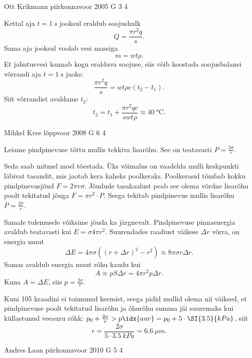 \documentclass[11pt, twoside]{article}
\begin{document}
{%
{Ott Krikmann} %
{piirkonnavoor} %
{2005} %
{G 3} %
{4} %
{

\ifSolution
Kettal aja $t = \SI{1}{s}$ jooksul eraldub soojushulk
\[
Q = \frac{\pi r^2 q}{s}.
\]
Sama aja jooksul voolab vesi massiga
\[
m = wt\rho.
\]
Et jahutusvesi kannab kogu eralduva soojuse, siis võib koostada soojusbalansi võrrandi aja $t = \SI{1}{s}$ jaoks:
\[
\frac{\pi r^{2} q}{s}=w t \rho c\left(t_{2}-t_{1}\right).
\]
Siit võrrandist avaldame $t_2$:
\[
t_2 = t_1 + \frac{\pi r^2qc}{swt\rho} \approx \SI{40}{\celsius}.
\]
\fi
}

{Mihkel Kree} %
{lõppvoor} %
{2008} %
{G 6} %
{4} %
{

\ifSolution
Leiame pindpinevuse tõttu mullis tekkiva lisarõhu. See on teatavasti $P = \frac{2\sigma}{r}$.

Seda saab mitmel moel tõestada. Üks võimalus on vaadelda mulli keskpunkti läbivat tasandit, mis jaotab kera kaheks poolkeraks. Poolkerasid tõmbab kokku pindpinevusjõud $F = 2\pi r\sigma$. Jõudude tasakaalust peab see olema võrdne lisarõhu poolt tekitatud jõuga $F = \pi r^2 \cdot P$. Seega tekitab pindpinevus mullis lisarõhu $P = \frac{2\sigma}{r}$.

Samale tulemusele võiksime jõuda ka järgnevalt. Pindpinevuse pinnaenergia avaldub teatavasti kui $E = \sigma 4\pi r^2$. Suurendades raadiust väikese $\Delta r$ võrra, on energia muut 
\[
\Delta E = 4\pi \sigma ((r+\Delta r)^2-r^2) \approx 8\pi \sigma r\Delta r.
\]
Samas avaldub energia muut rõhu kaudu kui
\[
A \approx pS\Delta r = 4\pi r^2p\Delta r.
\]
Kuna $A = \Delta E$, siis $p = \frac{2\sigma}{r}$.

Kuni 105 kraadini ei toimunud keemist, seega pidid mullid olema nii väiksed, et pindpinevuse poolt tekitatud lisarõhu ja õhurõhu summa jäi suuremaks kui küllastunud veeauru rõhk: $p_0 + \frac{2\sigma}{r} > p\idx{aur} = p_0 + 5 \cdot \SI{3.5}{kPa}$, siit 
\[
r = \frac{2\sigma}{5\cdot\SI{3.5}{kPa}} = \SI{6.6}{\mu m}.
\]
\fi
}

{Andres Laan} %
{piirkonnavoor} %
{2010} %
{G 5} %
{4} %
{

}}
\end{document}
